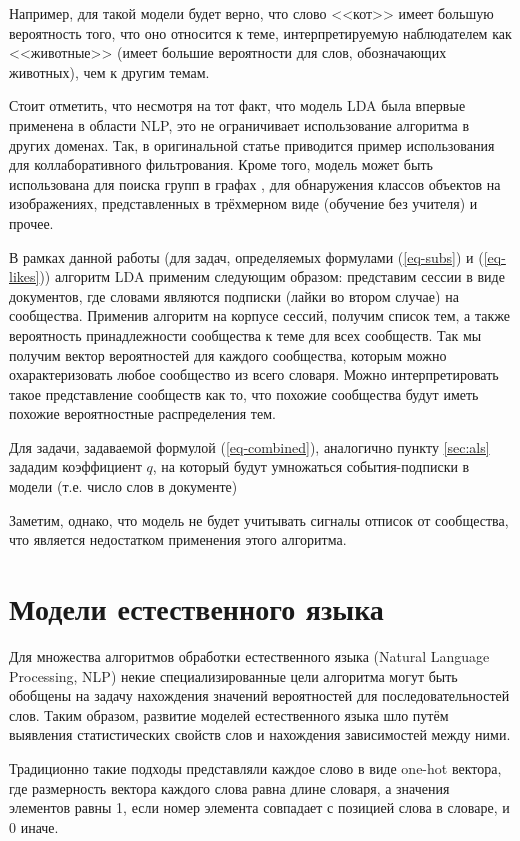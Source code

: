 \documentclass[times,specification,annotation]{itmo-student-thesis}
\begin{document}
Например, для такой модели будет верно, что слово <<кот>> имеет большую вероятность того, что оно относится к теме, интерпретируемую наблюдателем как <<животные>> (имеет большие вероятности для слов, обозначающих животных), чем к другим темам. 

Стоит отметить, что несмотря на тот факт, что модель LDA была впервые применена в области NLP, это не ограничивает использование алгоритма в других доменах. Так, в оригинальной статье \cite{lda2003} приводится пример использования для коллаборативного фильтрования. Кроме того, модель может быть использована для поиска групп в графах \cite{Henderson2009}, для обнаружения классов объектов на изображениях, представленных в трёхмерном виде (обучение без учителя) \cite{Endres2009} и прочее.

В рамках данной работы (для задач, определяемых формулами (\ref{eq-subs}) и (\ref{eq-likes})) алгоритм LDA применим следующим образом: представим сессии в виде документов, где словами являются подписки (лайки во втором случае) на сообщества. Применив алгоритм на корпусе сессий, получим список тем, а также вероятность принадлежности сообщества к теме для всех сообществ. Так мы получим вектор вероятностей для каждого сообщества, которым можно охарактеризовать любое сообщество из всего словаря. Можно интерпретировать такое представление сообществ как то, что похожие сообщества будут иметь похожие вероятностные распределения тем. 

Для задачи, задаваемой формулой (\ref{eq-combined}), аналогично пункту \ref{sec:als} зададим коэффициент $q$, на который будут умножаться события-подписки в модели (т.е. число слов в документе) 
 
Заметим, однако, что модель не будет учитывать сигналы отписок от сообщества, что является недостатком применения этого алгоритма. 

\section{Модели естественного языка}\label{sec:nlp-intro}

Для множества алгоритмов обработки естественного языка (Natural Language Processing, NLP) некие специализированные цели алгоритма могут быть обобщены на задачу нахождения значений вероятностей для последовательностей слов.
Таким образом, развитие моделей естественного языка шло путём выявления статистических свойств слов и нахождения зависимостей между ними.

Традиционно такие подходы представляли каждое слово в виде one-hot вектора, где размерность вектора каждого слова равна длине словаря, а значения элементов равны 1, если номер элемента совпадает с позицией слова в словаре, и 0 иначе.  
\end{document}

